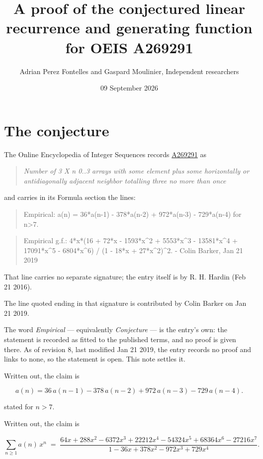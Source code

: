 \documentclass[11pt]{article}
\title{A proof of the conjectured linear recurrence and generating function for OEIS A269291}
\author{Adrian Perez Fontelles and Gaspard Moulinier, Independent researchers}
\date{09 September 2026}
\theoremstyle{definition}
\begin{document}
\maketitle
\section{The conjecture}

The Online Encyclopedia of Integer Sequences records \href{https://oeis.org/A269291}{A269291} as

\begin{quote}\itshape Number of 3 X n 0..3 arrays with some element plus some horizontally or antidiagonally adjacent neighbor totalling three no more than once\end{quote}

and carries in its Formula section the lines:

\begin{quote}\ttfamily Empirical: a(n) = 36*a(n-1) - 378*a(n-2) + 972*a(n-3) - 729*a(n-4) for n>7.\end{quote}

\begin{quote}\ttfamily Empirical g.f.: 4*x*(16 + 72*x - 1593*x\textasciicircum{}2 + 5553*x\textasciicircum{}3 - 13581*x\textasciicircum{}4 + 17091*x\textasciicircum{}5 - 6804*x\textasciicircum{}6) / (1 - 18*x + 27*x\textasciicircum{}2)\textasciicircum{}2. - Colin Barker, Jan 21 2019\end{quote}

That line carries no separate signature; the entry itself is by R. H. Hardin (Feb 21 2016).

The line quoted ending in that signature is contributed by Colin Barker on Jan 21 2019.

The word {\itshape Empirical} --- equivalently {\itshape Conjecture} --- is the entry's own: the statement is recorded as fitted to the published terms, and no proof is given there. As of revision 8, last modified Jan 21 2019, the entry records no proof and links to none, so the statement is open. This note settles it.

Written out, the claim is

\[a(n) = 36\,a(n-1) - 378\,a(n-2) + 972\,a(n-3) - 729\,a(n-4).\]

stated for $n > 7$.

Written out, the claim is

\[\sum_{n \ge 1} a(n)\,x^n \;=\; \frac{64x + 288x^{2} - 6372x^{3} + 22212x^{4} - 54324x^{5} + 68364x^{6} - 27216x^{7}}{1 - 36x + 378x^{2} - 972x^{3} + 729x^{4}}.\]
\end{document}
